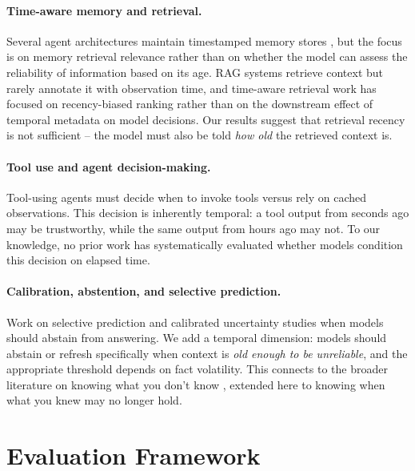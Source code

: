 \documentclass[11pt,a4paper]{article}
\begin{document}
\paragraph{Time-aware memory and retrieval.}
Several agent architectures maintain timestamped memory stores \citep{park2023generative,zhong2024memorybank}, but the focus is on memory retrieval relevance rather than on whether the model can assess the reliability of information based on its age.
RAG systems \citep{lewis2020retrieval} retrieve context but rarely annotate it with observation time, and time-aware retrieval work \citep{zhang2023retrieve} has focused on recency-biased ranking rather than on the downstream effect of temporal metadata on model decisions.
Our results suggest that retrieval recency is not sufficient -- the model must also be told \emph{how old} the retrieved context is.

\paragraph{Tool use and agent decision-making.}
Tool-using agents \citep{schick2023toolformer,qin2023toolllm} must decide when to invoke tools versus rely on cached observations.
This decision is inherently temporal: a tool output from seconds ago may be trustworthy, while the same output from hours ago may not.
To our knowledge, no prior work has systematically evaluated whether models condition this decision on elapsed time.

\paragraph{Calibration, abstention, and selective prediction.}
Work on selective prediction \citep{kamath2020selective} and calibrated uncertainty \citep{kadavath2022language} studies when models should abstain from answering.
We add a temporal dimension: models should abstain or refresh specifically when context is \emph{old enough to be unreliable}, and the appropriate threshold depends on fact volatility.
This connects to the broader literature on knowing what you don't know \citep{yin2023large}, extended here to knowing when what you knew may no longer hold.

\section{Evaluation Framework}
\label{sec:framework}
\end{document}
